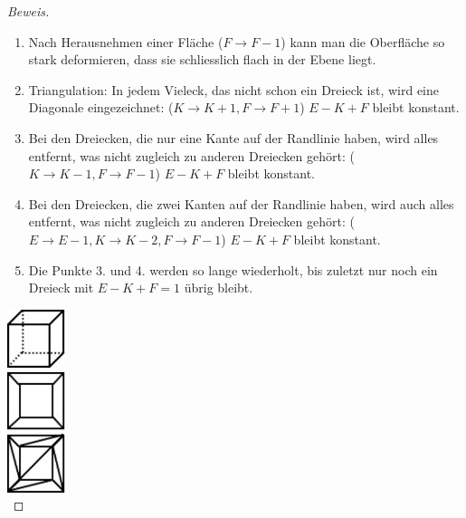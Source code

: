 \documentclass[%
11pt,%
twoside,%
titlepage,%
german,%
headsepline%
]{scrartcl}
\begin{document}
\begin{proof}[Beweis]
\begin{minipage}{0.618\textwidth}
\begin{enumerate}
\item Nach Herausnehmen einer Fl\"ache ($F\rightarrow F-1$) kann man die Oberfl\"ache so stark deformieren, dass sie schliesslich flach in der Ebene liegt.\\
\item Triangulation: In jedem Vieleck, das nicht schon ein Dreieck ist, wird eine Diagonale eingezeichnet: ($K\rightarrow K+1, F\rightarrow F+1$) $E-K+F$ bleibt konstant.\\
\item Bei den Dreiecken, die nur eine Kante auf der Randlinie haben, wird alles entfernt, was nicht zugleich zu anderen Dreiecken geh\"ort: ($K\rightarrow K-1, F\rightarrow  F-1$) $E-K+F$ bleibt konstant.\\
\item Bei den Dreiecken, die zwei Kanten auf der Randlinie haben, wird auch alles entfernt, was nicht zugleich zu anderen Dreiecken geh\"ort: ($E\rightarrow  E-1, K\rightarrow  K-2, F\rightarrow  F-1$) $E-K+F$ bleibt konstant.\\
\item Die Punkte 3. und 4. werden so lange wiederholt, bis zuletzt nur noch ein Dreieck mit $E-K+F=1$ \"ubrig bleibt.\\
\end{enumerate}
\end{minipage}
\hspace*{2cm}
\begin{minipage}{1.7cm}
\includegraphics[width=1.7cm]{pictures/wuerf1}\\[3ex]
\includegraphics[width=1.7cm]{pictures/wuerf2}\\[4ex]
\includegraphics[width=1.7cm]{pictures/wuerf3}\\[5ex]

\end{minipage}
\end{proof}
\end{document}
